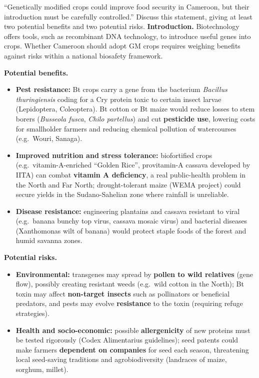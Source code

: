 \documentclass[11pt]{article}
\begin{document}
\begin{exoresolu}
``Genetically modified crops could improve food security in Cameroon, but their introduction must be carefully controlled.'' Discuss this statement, giving at least two potential benefits and two potential risks.
\tcblower
\textbf{Introduction.} Biotechnology offers tools, such as recombinant DNA technology, to introduce useful genes into crops. Whether Cameroon should adopt GM crops requires weighing benefits against risks within a national biosafety framework.

\textbf{Potential benefits.}
\begin{itemize}
\item \textbf{Pest resistance:} Bt crops carry a gene from the bacterium \emph{Bacillus thuringiensis} coding for a Cry protein toxic to certain insect larvae (Lepidoptera, Coleoptera). Bt cotton or Bt maize would reduce losses to stem borers (\emph{Busseola fusca}, \emph{Chilo partellus}) and cut \textbf{pesticide use}, lowering costs for smallholder farmers and reducing chemical pollution of watercourses (e.g.\ Wouri, Sanaga).
\item \textbf{Improved nutrition and stress tolerance:} biofortified crops (e.g.\ vitamin-A-enriched ``Golden Rice'', provitamin-A cassava developed by IITA) can combat \textbf{vitamin A deficiency}, a real public-health problem in the North and Far North; drought-tolerant maize (WEMA project) could secure yields in the Sudano-Sahelian zone where rainfall is unreliable.
\item \textbf{Disease resistance:} engineering plantains and cassava resistant to viral (e.g.\ banana bunchy top virus, cassava mosaic virus) and bacterial diseases (Xanthomonas wilt of banana) would protect staple foods of the forest and humid savanna zones.
\end{itemize}

\textbf{Potential risks.}
\begin{itemize}
\item \textbf{Environmental:} transgenes may spread by \textbf{pollen to wild relatives} (gene flow), possibly creating resistant weeds (e.g.\ wild cotton in the North); Bt toxin may affect \textbf{non-target insects} such as pollinators or beneficial predators, and pests may evolve \textbf{resistance} to the toxin (requiring refuge strategies).
\item \textbf{Health and socio-economic:} possible \textbf{allergenicity} of new proteins must be tested rigorously (Codex Alimentarius guidelines); seed patents could make farmers \textbf{dependent on companies} for seed each season, threatening local seed-saving traditions and agrobiodiversity (landraces of maize, sorghum, millet).
\end{itemize}


\end{exoresolu}
\end{document}

